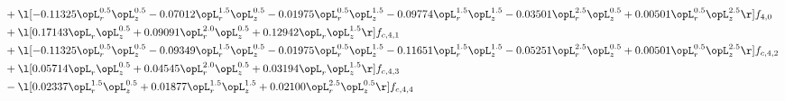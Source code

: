 \begin{alignat}{2}
& + \l[  -0.11325 \opL_r^{0.5} \opL_z^{0.5}   -0.07012 \opL_r^{1.5} \opL_z^{0.5}   -0.01975 \opL_r^{0.5} \opL_z^{1.5}   -0.09774 \opL_r^{1.5} \opL_z^{1.5}   -0.03501 \opL_r^{2.5} \opL_z^{0.5} +  0.00501 \opL_r^{0.5} \opL_z^{2.5}  \r] f_{4,0} \nonumber \\ 
& + \l[  0.17143 \opL_r \opL_z^{0.5} +  0.09091 \opL_r^{2.0} \opL_z^{0.5} +  0.12942 \opL_r \opL_z^{1.5}  \r] f_{c,4,1} \nonumber \\ 
& + \l[  -0.11325 \opL_r^{0.5} \opL_z^{0.5}   -0.09349 \opL_r^{1.5} \opL_z^{0.5}   -0.01975 \opL_r^{0.5} \opL_z^{1.5}   -0.11651 \opL_r^{1.5} \opL_z^{1.5}   -0.05251 \opL_r^{2.5} \opL_z^{0.5} +  0.00501 \opL_r^{0.5} \opL_z^{2.5}  \r] f_{c,4,2} \nonumber \\ 
& + \l[  0.05714 \opL_r \opL_z^{0.5} +  0.04545 \opL_r^{2.0} \opL_z^{0.5} +  0.03194 \opL_r \opL_z^{1.5}  \r] f_{c,4,3} \nonumber \\ 
& - \l[  0.02337 \opL_r^{1.5} \opL_z^{0.5} +  0.01877 \opL_r^{1.5} \opL_z^{1.5} +  0.02100 \opL_r^{2.5} \opL_z^{0.5}  \r] f_{c,4,4} \nonumber \\ 
\end{alignat} 


